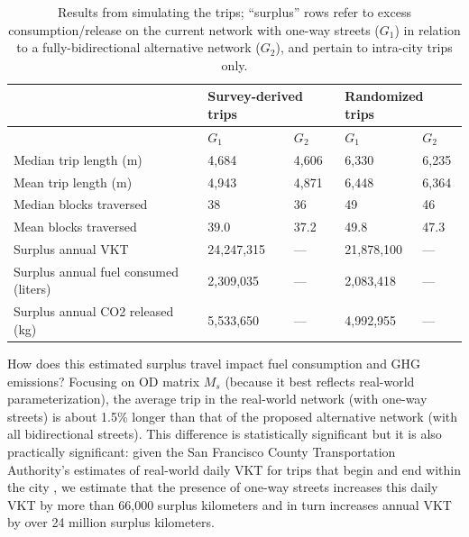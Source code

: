 \documentclass{trbunofficial}
\begin{document}
\begin{table}[tbp]
\centering
\caption{Results from simulating the trips; \enquote{surplus} rows refer to excess consumption/release on the current network with one-way streets ($G_1$) in relation to a fully-bidirectional alternative network ($G_2$), and pertain to intra-city trips only.}
\label{tab:results}
\footnotesize
\begin{tabular}{lllll}
\toprule
& \multicolumn{2}{l}{Survey-derived trips} & \multicolumn{2}{l}{Randomized trips}   \\
\midrule                                         
                                      & $G_1$      & $G_2$  & $G_1$      & $G_2$    \\
\midrule
Median trip length (m)                & 4,684      & 4,606  & 6,330      & 6,235    \\
Mean trip length (m)                  & 4,943      & 4,871  & 6,448      & 6,364    \\
Median blocks traversed               & 38         & 36     & 49         & 46       \\
Mean blocks traversed                 & 39.0       & 37.2   & 49.8       & 47.3     \\
Surplus annual VKT                    & 24,247,315 & ---    & 21,878,100 & ---      \\
Surplus annual fuel consumed (liters) & 2,309,035  & ---    & 2,083,418  & ---      \\
Surplus annual CO2 released (kg)      & 5,533,650  & ---    & 4,992,955  & ---      \\
\bottomrule
\end{tabular}
\end{table}


How does this estimated surplus travel impact fuel consumption and GHG emissions? Focusing on OD matrix $M_s$ (because it best reflects real-world parameterization), the average trip in the real-world network (with one-way streets) is about 1.5\% longer than that of the proposed alternative network (with all bidirectional streets). This difference is statistically significant but it is also practically significant: given the San Francisco County Transportation Authority's estimates of real-world daily VKT for trips that begin and end within the city \cite{san_francisco_county_transportation_authority_tncs_2017}, we estimate that the presence of one-way streets increases this daily VKT by more than 66,000 surplus kilometers and in turn increases annual VKT by over 24 million surplus kilometers.
\end{document}
